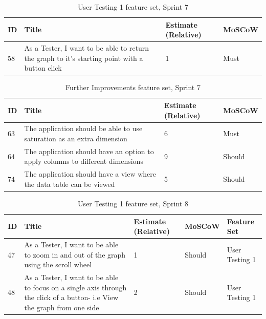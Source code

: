 \begin{table}[hbt!]
    \begin{tabularx}{\textwidth}{ | X | X | X | X | }
        \hline
        ID & Title                                                                                         & Estimate (Relative) & MoSCoW \\
        \hline
        58 & As a Tester, I want to be able to return the graph to it's starting point with a button click & 1                   & Must   \\
        \hline
    \end{tabularx}
    \caption{User Testing 1 feature set, Sprint 7}
    \label{sprint7}
\end{table}

\begin{table}[hbt!]
    \begin{tabularx}{\textwidth}{ | X | X | X | X | }
        \hline
        ID & Title                                                                          & Estimate (Relative) & MoSCoW \\
        \hline
        63 & The application should be able to use saturation as an extra dimension         & 6                   & Must   \\
        \hline
        64 & The application should have an option to apply columns to different dimensions & 9                   & Should \\
        \hline
        74 & The application should have a view where the data table can be viewed          & 5                   & Should \\
        \hline
    \end{tabularx}
    \caption{Further Improvements feature set, Sprint 7}
    \label{sprint7-2}
\end{table}

\begin{table}[hbt!]
    \begin{tabularx}{\textwidth}{ | X | X | X | X | X | }
        \hline
        ID & Title                                                                                                                    & Estimate (Relative) & MoSCoW & Feature Set    \\
        \hline
        47 & As a Tester, I want to be able to zoom in and out of the graph using the scroll wheel                                    & 1                   & Should & User Testing 1 \\
        \hline
        48 & As a Tester, I want to be able to focus on a single axis through the click of a button- i.e View the graph from one side & 2                   & Should & User Testing 1 \\
        \hline
    \end{tabularx}
    \caption{User Testing 1 feature set, Sprint 8}
    \label{sprint8}
\end{table}

